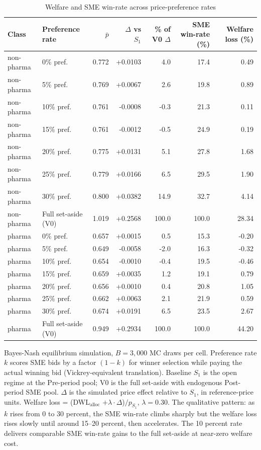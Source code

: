 \begin{table}[!htbp]
\centering
\small
\caption{Welfare and SME win-rate across price-preference rates}
\label{tab:v3_preference_grid}
\begin{threeparttable}
\begin{tabular}{llrrrrr}
\toprule
Class & Preference rate & $\bar p$ & $\Delta$ vs $S_1$ & \% of V0 $\Delta$ & SME win-rate (\%) & Welfare loss (\%) \\
\midrule
non-pharma & 0\% pref. & 0.772 & +0.0103 & 4.0 & 17.4 & 0.49 \\
non-pharma & 5\% pref. & 0.769 & +0.0067 & 2.6 & 19.8 & 0.89 \\
non-pharma & 10\% pref. & 0.761 & -0.0008 & -0.3 & 21.3 & 0.11 \\
non-pharma & 15\% pref. & 0.761 & -0.0012 & -0.5 & 24.9 & 0.19 \\
non-pharma & 20\% pref. & 0.775 & +0.0131 & 5.1 & 27.8 & 1.68 \\
non-pharma & 25\% pref. & 0.779 & +0.0166 & 6.5 & 29.5 & 1.90 \\
non-pharma & 30\% pref. & 0.800 & +0.0382 & 14.9 & 32.7 & 4.14 \\
non-pharma & Full set-aside (V0) & 1.019 & +0.2568 & 100.0 & 100.0 & 28.34 \\
pharma & 0\% pref. & 0.657 & +0.0015 & 0.5 & 15.3 & -0.20 \\
pharma & 5\% pref. & 0.649 & -0.0058 & -2.0 & 16.3 & -0.32 \\
pharma & 10\% pref. & 0.654 & -0.0010 & -0.4 & 19.5 & -0.46 \\
pharma & 15\% pref. & 0.659 & +0.0035 & 1.2 & 19.1 & 0.79 \\
pharma & 20\% pref. & 0.656 & +0.0010 & 0.4 & 20.8 & 1.05 \\
pharma & 25\% pref. & 0.662 & +0.0063 & 2.1 & 21.9 & 0.59 \\
pharma & 30\% pref. & 0.674 & +0.0191 & 6.5 & 23.5 & 2.67 \\
pharma & Full set-aside (V0) & 0.949 & +0.2934 & 100.0 & 100.0 & 44.20 \\
\bottomrule
\end{tabular}
\begin{tablenotes}\footnotesize
\item Bayes-Nash equilibrium simulation, $B = 3{,}000$ MC draws per cell.
Preference rate $k$ scores SME bids by a factor $(1-k)$ for winner
selection while paying the actual winning bid (Vickrey-equivalent
translation). Baseline $S_1$ is the open regime at the Pre-period
pool; V0 is the full set-aside with endogenous Post-period SME pool.
$\Delta$ is the simulated price effect relative to $S_1$, in
reference-price units. Welfare loss = (DWL$_{\text{alloc}}$
$+ \lambda \cdot \Delta$)$/p_{S_1}$, $\lambda = 0.30$. The
qualitative pattern: as $k$ rises from 0 to 30 percent, the SME
win-rate climbs sharply but the welfare loss rises slowly until
around 15--20 percent, then accelerates. The 10 percent rate
delivers comparable SME win-rate gains to the full set-aside at
near-zero welfare cost.
\end{tablenotes}
\end{threeparttable}
\end{table}
